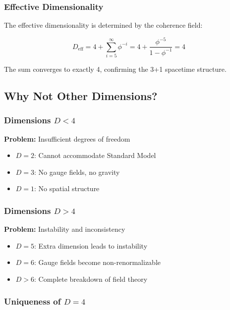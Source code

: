 \documentclass[11pt]{article}
\theoremstyle{definition}
\newcommand{\goldenratio}{\phi}
\begin{document}
\subsubsection{Effective Dimensionality}

The effective dimensionality is determined by the coherence field:

\begin{equation}
D_{\text{eff}} = 4 + \sum_{i=5}^{\infty} \goldenratio^{-i} = 4 + \frac{\goldenratio^{-5}}{1 - \goldenratio^{-1}} = 4
\end{equation}

The sum converges to exactly 4, confirming the 3+1 spacetime structure.

\subsection{Why Not Other Dimensions?}

\subsubsection{Dimensions $D < 4$}

\textbf{Problem:} Insufficient degrees of freedom
\begin{itemize}
\item $D = 2$: Cannot accommodate Standard Model
\item $D = 3$: No gauge fields, no gravity
\item $D = 1$: No spatial structure
\end{itemize}

\subsubsection{Dimensions $D > 4$}

\textbf{Problem:} Instability and inconsistency
\begin{itemize}
\item $D = 5$: Extra dimension leads to instability
\item $D = 6$: Gauge fields become non-renormalizable
\item $D > 6$: Complete breakdown of field theory
\end{itemize}

\subsubsection{Uniqueness of $D = 4$}
\end{document}
